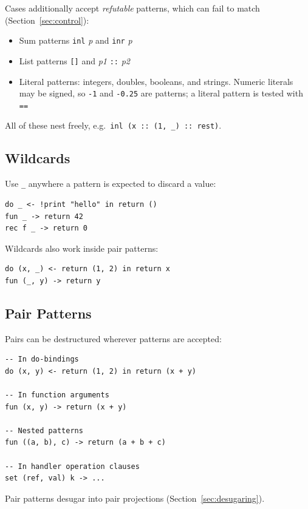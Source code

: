 \documentclass[11pt,a4paper]{article}
\newcommand{\cba}[1]{\lstinline[style=cbainline]{#1}}
\begin{document}
Cases additionally accept \emph{refutable} patterns, which can
fail to match (Section~\ref{sec:control}):

\begin{itemize}
  \item Sum patterns \cba{inl} \emph{p} and \cba{inr} \emph{p}
  \item List patterns \cba{[]} and \emph{p1} \cba{::} \emph{p2}
  \item Literal patterns: integers, doubles, booleans, and strings.  Numeric
        literals may be signed, so \cba{-1} and \cba{-0.25} are patterns; a
        literal pattern is tested with \texttt{==}
\end{itemize}

All of these nest freely, e.g.\ \cba{inl (x :: (1, _) :: rest)}.

\subsection{Wildcards}

Use \cba{_} anywhere a pattern is expected to discard a value:

\begin{lstlisting}
do _ <- !print "hello" in return ()
fun _ -> return 42
rec f _ -> return 0
\end{lstlisting}

Wildcards also work inside pair patterns:

\begin{lstlisting}
do (x, _) <- return (1, 2) in return x
fun (_, y) -> return y
\end{lstlisting}

\subsection{Pair Patterns}

Pairs can be destructured wherever patterns are accepted:

\begin{lstlisting}
-- In do-bindings
do (x, y) <- return (1, 2) in return (x + y)

-- In function arguments
fun (x, y) -> return (x + y)

-- Nested patterns
fun ((a, b), c) -> return (a + b + c)

-- In handler operation clauses
set (ref, val) k -> ...
\end{lstlisting}

Pair patterns desugar into pair projections
(Section~\ref{sec:desugaring}).
\end{document}
